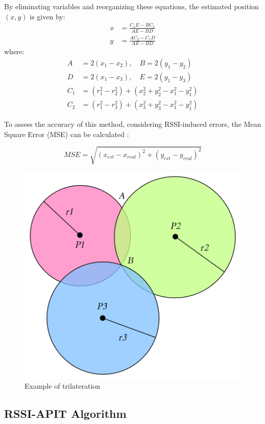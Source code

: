 By eliminating variables and reorganizing these equations, the estimated position $(x, y)$ is given by:  
\begin{equation}
    \begin{split}
        x & = \frac{C_1E - B C_2}{AE - BD} \\
        y & = \frac{A C_2 - C_1D}{AE - BD}
    \end{split}
\end{equation}
where:
\begin{equation}
    \begin{split}
        A & = 2(x_1 - x_2), \quad B = 2(y_1 - y_2) \\
        D & = 2(x_1 - x_3), \quad E = 2(y_1 - y_3) \\
        C_1 & = (r_1^2 - r_2^2) + (x_2^2 + y_2^2 - x_1^2 - y_1^2) \\
        C_2 & = (r_1^2 - r_3^2) + (x_3^2 + y_3^2 - x_1^2 - y_1^2)
    \end{split}
\end{equation}

To assess the accuracy of this method, considering RSSI-induced errors, the Mean Square Error (MSE) can be calculated \cite{spachos_ble_2020}:

\begin{equation}
    MSE = \sqrt{(x_{est}-x_{real})^2 + (y_{est}-y_{real})^2}
\end{equation}

\begin{figure}[ht]
    \centering
    \includegraphics[width=0.5\linewidth]{assets/trilateration.png}
    \caption{Example of trilateration}
    \label{fig:trilateration}
\end{figure}

\subsection{RSSI-APIT Algorithm}

